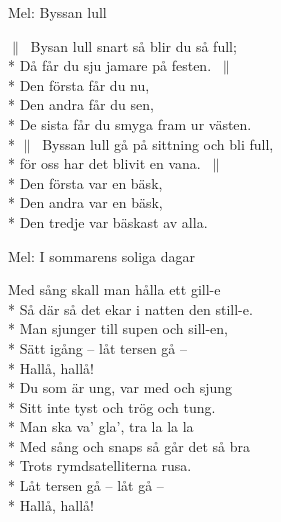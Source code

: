 \begin{SongText}
    \begin{SongInfo}
        Mel: Byssan lull
    \end{SongInfo}
    \begin{SongVerse}
        $\|\:$ Bysan lull snart så blir du så full;\\*%
        Då får du sju jamare på festen. $\:\|$\\*%
        Den första får du nu,\\*%
        Den andra får du sen,\\*%
        De sista får du smyga fram ur västen.\\*%
        $\|\:$ Byssan lull gå på sittning och bli full,\\*%
        för oss har det blivit en vana. $\:\|$\\*%
        Den första var en bäsk,\\*%
        Den andra var en bäsk,\\*%
        Den tredje var bäskast av alla.
    \end{SongVerse}
\end{SongText}
\begin{SongText}
    \begin{SongInfo}
        Mel: I sommarens soliga dagar
    \end{SongInfo}
    \begin{SongVerse}
        Med sång skall man hålla ett gill-e\\*%
        Så där så det ekar i natten den still-e.\\*%
        Man sjunger till supen och sill-en,\\*%
        Sätt igång – låt tersen gå –\\*%
        Hallå, hallå!\\*%
        Du som är ung, var med och sjung\\*%
        Sitt inte tyst och trög och tung.\\*%
        Man ska va’ gla’, tra la la la\\*%
        Med sång och snaps så går det så bra\\*%
        Trots rymdsatelliterna rusa.\\*%
        Låt tersen gå – låt gå –\\*%
        Hallå, hallå!
    \end{SongVerse}
\end{SongText}
